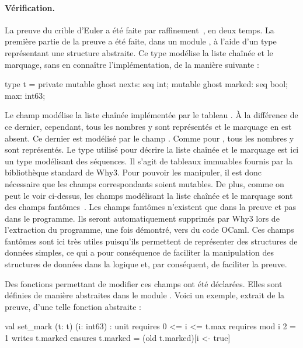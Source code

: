 \documentclass[a4paper]{easychair}
\begin{document}
\paragraph{Vérification.}



La preuve du crible d'Euler a été faite par
raffinement~\cite{paskevich20isola}, en deux temps.
%
La première partie de la preuve a été faite, dans un module
, à l'aide d'un type  représentant une
structure abstraite.  Ce type modélise la liste chaînée et le
marquage, sans en connaître l'implémentation, de la manière suivante :
\begin{why3}
type t = private {
  mutable ghost nexts: seq int;
  mutable ghost marked: seq bool;
  max: int63;
}
\end{why3}
Le champ  modélise la liste chaînée implémentée par le
tableau . À la différence de ce dernier, cependant, tous les
nombres y sont représentés et le marquage en est absent.
Ce dernier est modélisé par le champ . Comme pour ,
tous les nombres y sont représentés.
Le type  utilisé pour décrire la liste chaînée et le marquage
est ici un type modélisant des séquences.
Il s'agit de tableaux immuables fournis par la bibliothèque standard
de Why3. Pour pouvoir les manipuler, il est donc nécessaire que les champs
correspondants soient mutables.
De plus, comme on peut le voir ci-dessus, les champs modélisant la liste
chaînée et le marquage sont des champs fantômes~\cite{ghost-code}.
Les champs fantômes n'existent que dans la preuve et pas dans
le programme. Ils seront automatiquement supprimés par Why3 lors
de l'extraction du programme, une fois démontré, vers du code OCaml.
Ces champs fantômes sont ici très utiles puisqu'ils permettent de représenter
des structures de données simples, ce qui a pour conséquence de faciliter
la manipulation des structures de données dans la logique et, par conséquent,
de faciliter la preuve.

Des fonctions permettant de modifier ces champs ont été déclarées.
Elles sont définies de manière abstraites dans le module .
Voici un exemple, extrait de la preuve, d'une telle fonction abstraite :
\begin{why3}
val set_mark (t: t) (i: int63) : unit
  requires { 0 <= i <= t.max }
  requires { mod i 2 = 1 }
  writes   { t.marked }
  ensures  { t.marked = (old t.marked)[i <- true] }
\end{why3}
\end{document}
